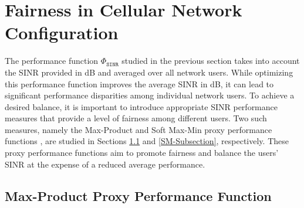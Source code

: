 \section{Fairness in Cellular Network Configuration}\label{SM-MP-Chapter}

The performance function $\Phi_{\mathtt{SINR}}$ studied in the previous section takes into account the SINR provided in dB and averaged over all network users. While optimizing this performance function improves the average SINR in dB, it can lead to significant performance disparities among individual network users. To achieve a desired balance, it is important to introduce appropriate SINR performance measures that provide a level of fairness among different users. Two such measures, namely the Max-Product and Soft Max-Min proxy performance functions \cite{nikbakht2020unsupervised}, are studied in Sections \ref{MP-Subsection} and \ref{SM-Subsection}, respectively. These proxy performance functions aim to promote fairness and balance the users' SINR at the expense of a reduced average performance.




\subsection{Max-Product Proxy Performance Function}\label{MP-Subsection}


